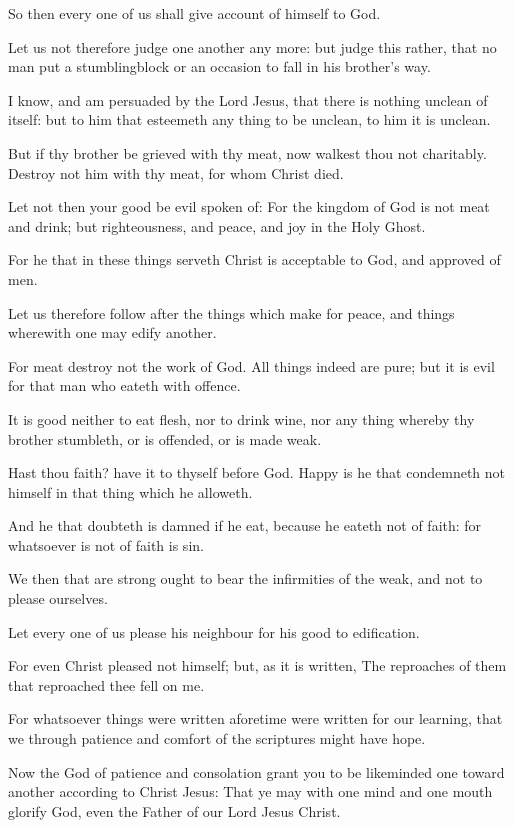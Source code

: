 \Verse So then every one of us shall give account of himself to God.

\Verse Let us not therefore judge one another any more: but judge this rather, that no man put a stumblingblock or an occasion to fall in his brother's way.

\Verse I know, and am persuaded by the Lord Jesus, that there is nothing unclean of itself: but to him that esteemeth any thing to be unclean, to him it is unclean.

\Verse But if thy brother be grieved with thy meat, now walkest thou not charitably. Destroy not him with thy meat, for whom Christ died.

\Verse Let not then your good be evil spoken of: \Verse For the kingdom of God is not meat and drink; but righteousness, and peace, and joy in the Holy Ghost.

\Verse For he that in these things serveth Christ is acceptable to God, and approved of men.

\Verse Let us therefore follow after the things which make for peace, and things wherewith one may edify another.

\Verse For meat destroy not the work of God. All things indeed are pure; but it is evil for that man who eateth with offence.

\Verse It is good neither to eat flesh, nor to drink wine, nor any thing whereby thy brother stumbleth, or is offended, or is made weak.

\Verse Hast thou faith? have it to thyself before God. Happy is he that condemneth not himself in that thing which he alloweth.

\Verse And he that doubteth is damned if he eat, because he eateth not of faith: for whatsoever is not of faith is sin.


\Chapter
\Verse We then that are strong ought to bear the infirmities of the weak, and not to please ourselves.

\Verse Let every one of us please his neighbour for his good to edification.

\Verse For even Christ pleased not himself; but, as it is written, The reproaches of them that reproached thee fell on me.

\Verse For whatsoever things were written aforetime were written for our learning, that we through patience and comfort of the scriptures might have hope.

\Verse Now the God of patience and consolation grant you to be likeminded one toward another according to Christ Jesus: \Verse That ye may with one mind and one mouth glorify God, even the Father of our Lord Jesus Christ.

